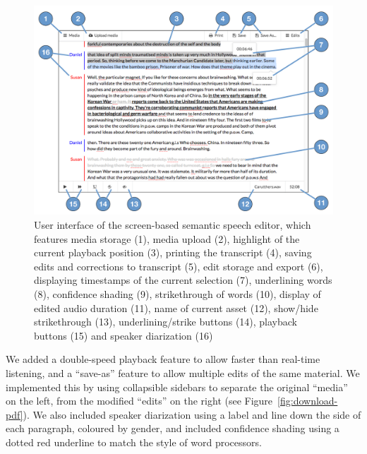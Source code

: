 \begin{figure}
  \centering
  \includegraphics[width=\columnwidth]{figs/discourse-interface-labelled.pdf}
  \caption[User interface of the screen-based semantic speech editor.]{User interface of the screen-based semantic
    speech editor, which features 
    media storage (1),
    media upload (2),
    highlight of the current playback position (3),
    printing the transcript (4),
    saving edits and corrections to transcript (5),
    edit storage and export (6),
    displaying timestamps of the current selection (7),
    underlining words (8),
    confidence shading (9),
    strikethrough of words (10),
    display of edited audio duration (11),
    name of current asset (12),
    show/hide strikethrough (13),
    underlining/strike buttons (14),
    playback buttons (15)
  and speaker diarization (16)}
  \label{fig:dialogger-interface}
\end{figure}

We added a double-speed playback feature to allow faster than real-time listening, and a ``save-as'' feature to allow
multiple edits of the same material.  We implemented this by using collapsible sidebars to separate the original
``media'' on the left, from the modified ``edits'' on the right (see Figure~\ref{fig:download-pdf}).  We also included
speaker diarization using a label and line down the side of each paragraph, coloured by gender, and included confidence
shading using a dotted red underline to match the style of word processors.

